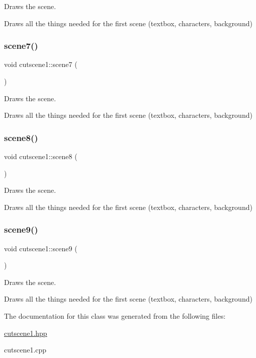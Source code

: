 Draws the scene. 

Draws all the things needed for the first scene (textbox, characters, background) \mbox{\label{classcutscene1_a5f5798e0f4ab664320f0f35aaa22b2a3}} 
\subsubsection{\texorpdfstring{scene7()}{scene7()}}
{\footnotesize\ttfamily void cutscene1\+::scene7 (\begin{DoxyParamCaption}{ }\end{DoxyParamCaption})}



Draws the scene. 

Draws all the things needed for the first scene (textbox, characters, background) \mbox{\label{classcutscene1_a9f335e0ddd6112269bfd88a3b0cecdb5}} 
\subsubsection{\texorpdfstring{scene8()}{scene8()}}
{\footnotesize\ttfamily void cutscene1\+::scene8 (\begin{DoxyParamCaption}{ }\end{DoxyParamCaption})}



Draws the scene. 

Draws all the things needed for the first scene (textbox, characters, background) \mbox{\label{classcutscene1_a5876edaf8fe041660e98c7aa8ca9c18b}} 
\subsubsection{\texorpdfstring{scene9()}{scene9()}}
{\footnotesize\ttfamily void cutscene1\+::scene9 (\begin{DoxyParamCaption}{ }\end{DoxyParamCaption})}



Draws the scene. 

Draws all the things needed for the first scene (textbox, characters, background) 

The documentation for this class was generated from the following files\+:\begin{DoxyCompactItemize}
\item 
\hyperlink{cutscene1_8hpp}{cutscene1.\+hpp}\item 
cutscene1.\+cpp\end{DoxyCompactItemize}

